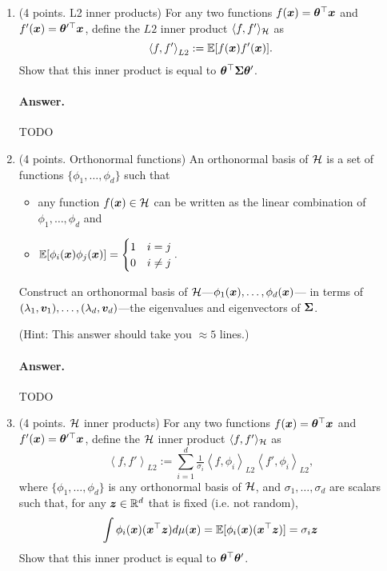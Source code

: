 \documentclass[11pt,letterpaper]{article}
\newenvironment{answer}{%
    \vspace{1em}
    \color{black}
    \paragraph{Answer.}
  }{%
    \vspace{1em}
  }
\begin{document}
\begin{enumerate}

  \item (4 points. L2 inner products)
    For any two functions $f({\bm{x}}) = {\bm{\theta}}^\top {\bm{x}}$ and $f'({\bm{x}}) = {\bm{\theta}}^{\prime\top} {\bm{x}}$,
    define the $L2$ inner product $\langle f, f' \rangle_{\mathcal{H}}$ as
    $$ \left\langle f, f' \right\rangle_{L2} := \mathbb{E}[ f({\bm{x}}) f'({\bm{x}}) ]. $$
    Show that this inner product is equal to ${\bm{\theta}}^\top {\bm{\Sigma}} {\bm{\theta}}'$.

\begin{answer}
  TODO
\end{answer}

  \item (4 points. Orthonormal functions)
    An orthonormal basis of $\mathcal{H}$ is a set of functions $\{ \phi_1, \ldots, \phi_d \}$ such that
    \begin{itemize}
      \item any function $f({\bm{x}}) \in \mathcal{H}$ can be written as the linear combination of $\phi_1, \ldots, \phi_d$ and
      \item $\mathbb{E}[ \phi_i({\bm{x}}) \phi_j({\bm{x}}) ]= \begin{cases} 1 & i=j \\ 0 & i \ne j \end{cases}.$
    \end{itemize}
    Construct an orthonormal basis of $\mathcal{H}$---$\phi_1({\bm{x}}), \ldots, \phi_d({\bm{x}})$---%
    in terms of $(\lambda_1, {\bm{v}}_1), \ldots, (\lambda_d, {\bm{v}}_d)$---the eigenvalues and eigenvectors of ${\bm{\Sigma}}$.

    (Hint: This answer should take you $\approx 5$ lines.)

\begin{answer}
  TODO
\end{answer}

  \item (4 points. $\mathcal{H}$ inner products)
    For any two functions $f({\bm{x}}) = {\bm{\theta}}^\top {\bm{x}}$ and $f'({\bm{x}}) = {\bm{\theta}}^{\prime\top} {\bm{x}}$,
    define the $\mathcal{H}$ inner product $\langle f, f' \rangle_{\mathcal{H}}$ as
    $$ \left\langle f, f' \right\rangle_{L2} := \sum_{i=1}^d
      \tfrac{1}{\sigma_i}
      \left\langle f, \phi_i \right\rangle_{L2}
      \left\langle f', \phi_i \right\rangle_{L2},
    $$
    where $\{ \phi_1, \ldots, \phi_d \}$ is any orthonormal basis of $\mathcal{H}$,
    and $\sigma_1, \ldots, \sigma_d$ are scalars such that, for any ${\bm{z}} \in \mathbb{R}^d$ that is fixed (i.e. not random),
    $$
      \int \phi_i({\bm{x}}) ({\bm{x}}^\top {\bm{z}}) d\mu({\bm{x}}) = \mathbb{E}[ \phi_i({\bm{x}}) ({\bm{x}}^\top {\bm{z}})] = \sigma_i {\bm{z}}
    $$
    Show that this inner product is equal to ${\bm{\theta}}^\top {\bm{\theta}}'$.


\end{enumerate}
\end{document}
